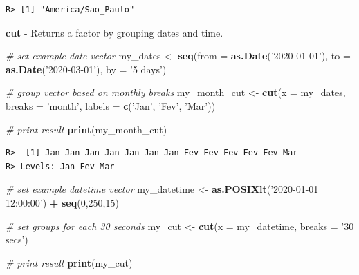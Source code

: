 \documentclass[
  12pt,
]{book}
\newenvironment{Shaded}{\begin{snugshade}}{\end{snugshade}}
\newcommand{\CommentTok}[1]{\textcolor[rgb]{0.37,0.37,0.37}{\textit{#1}}}
\newcommand{\DataTypeTok}[1]{\textcolor[rgb]{0.27,0.27,0.27}{#1}}
\newcommand{\DecValTok}[1]{\textcolor[rgb]{0.06,0.06,0.06}{#1}}
\newcommand{\KeywordTok}[1]{\textcolor[rgb]{0.27,0.27,0.27}{\textbf{#1}}}
\newcommand{\NormalTok}[1]{#1}
\newcommand{\OperatorTok}[1]{\textcolor[rgb]{0.43,0.43,0.43}{\textbf{#1}}}
\newcommand{\StringTok}[1]{\textcolor[rgb]{0.5,0.5,0.5}{#1}}
\begin{document}
\begin{verbatim}
R> [1] "America/Sao_Paulo"
\end{verbatim}

\textbf{cut} - Returns a factor by grouping dates and time. 

\begin{Shaded}
\begin{Highlighting}[]
\CommentTok{# set example date vector}
\NormalTok{my_dates <-}\StringTok{ }\KeywordTok{seq}\NormalTok{(}\DataTypeTok{from =} \KeywordTok{as.Date}\NormalTok{(}\StringTok{'2020-01-01'}\NormalTok{),}
                \DataTypeTok{to =} \KeywordTok{as.Date}\NormalTok{(}\StringTok{'2020-03-01'}\NormalTok{),}
                \DataTypeTok{by =} \StringTok{'5 days'}\NormalTok{)}

\CommentTok{# group vector based on monthly breaks}
\NormalTok{my_month_cut <-}\StringTok{ }\KeywordTok{cut}\NormalTok{(}\DataTypeTok{x =}\NormalTok{ my_dates,}
                    \DataTypeTok{breaks =} \StringTok{'month'}\NormalTok{,}
                    \DataTypeTok{labels =} \KeywordTok{c}\NormalTok{(}\StringTok{'Jan'}\NormalTok{, }\StringTok{'Fev'}\NormalTok{, }\StringTok{'Mar'}\NormalTok{))}

\CommentTok{# print result}
\KeywordTok{print}\NormalTok{(my_month_cut)}
\end{Highlighting}
\end{Shaded}

\begin{verbatim}
R>  [1] Jan Jan Jan Jan Jan Jan Jan Fev Fev Fev Fev Fev Mar
R> Levels: Jan Fev Mar
\end{verbatim}

\begin{Shaded}
\begin{Highlighting}[]
\CommentTok{# set example datetime vector}
\NormalTok{my_datetime <-}\StringTok{ }\KeywordTok{as.POSIXlt}\NormalTok{(}\StringTok{'2020-01-01 12:00:00'}\NormalTok{) }\OperatorTok{+}\StringTok{ }\KeywordTok{seq}\NormalTok{(}\DecValTok{0}\NormalTok{,}\DecValTok{250}\NormalTok{,}\DecValTok{15}\NormalTok{)}

\CommentTok{# set groups for each 30 seconds}
\NormalTok{my_cut <-}\StringTok{ }\KeywordTok{cut}\NormalTok{(}\DataTypeTok{x =}\NormalTok{ my_datetime, }\DataTypeTok{breaks =} \StringTok{'30 secs'}\NormalTok{)}

\CommentTok{# print result}
\KeywordTok{print}\NormalTok{(my_cut)}
\end{Highlighting}
\end{Shaded}
\end{document}
